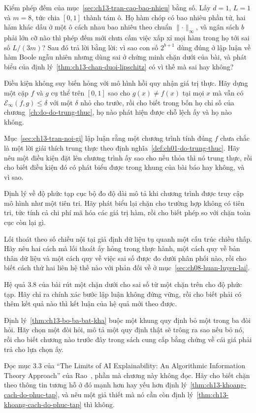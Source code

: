 \cauhoi
\begin{cauhoids}
  \item Kiểm phép đếm của mục~\ref{sec:ch13-tran-cao-bao-nhieu} bằng số. Lấy
  $d = 1$, $L = 1$ và $m = 8$, tức chia $[0,1]$ thành tám ô. Họ hàm chóp có bao
  nhiêu phần tử, hai hàm khác dấu ở một ô cách nhau bao nhiêu theo chuẩn
  $\lVert\cdot\rVert_{\infty}$, và ngân sách $b$ phải lớn cỡ nào thì phép đếm
  mới chưa cấm việc xấp xỉ mọi hàm trong họ tới sai số $L/(3m)$? Sau đó trả lời
  bằng lời: vì sao con số $2^{b+1}$ dùng đúng ở lập luận về hàm Boole ngẫu nhiên
  nhưng dùng sai ở chứng minh chặn dưới của bài, và phát biểu của định
  lý~\ref{thm:ch13-chan-duoi-lipschitz} có vì thế mà sai hay không?
  \item Điều kiện không suy biến hỏng với mô hình hồi quy nhận giá trị thực. Hãy
  dựng một cặp $f$ và $g$ cụ thể trên $[0,1]$ sao cho $g(x) \ne f(x)$ tại mọi
  $x$ mà vẫn có $\mathcal{E}_{\infty}(f,g) \le \delta$ với một $\delta$ nhỏ cho
  trước, rồi cho biết trong bốn họ chỉ số của
  chương~\ref{ch:do-do-trung-thuc}, họ nào phát hiện được chỗ lệch ấy và họ nào
  không.
  \item Mục~\ref{sec:ch13-tran-noi-gi} lập luận rằng một chương trình tính đúng
  $f$ chưa chắc là một lời giải thích trung thực theo định
  nghĩa~\ref{def:ch01-do-trung-thuc}. Hãy nêu một điều kiện đặt lên chương trình
  ấy sao cho nếu thỏa thì nó trung thực, rồi cho biết điều kiện đó có phát biểu
  được trong khung của bài báo hay không, và vì sao.
  \item Định lý về độ phức tạp cục bộ đo độ dài mô tả khi chương trình được truy
  cập mô hình như một tiên tri. Hãy phát biểu lại chặn cho trường hợp không có
  tiên tri, tức tính cả chi phí mã hóa các giá trị hàm, rồi cho biết phép so với
  chặn toàn cục còn lại gì.
  \item Lối thoát theo số chiều nội tại giả định dữ liệu tụ quanh một cấu trúc
  chiều thấp. Hãy nêu hai cách mà lối thoát ấy hỏng trong thực hành, một cách
  quy về bản thân dữ liệu và một cách quy về việc sai số được đo dưới phân phối
  nào, rồi cho biết cách thứ hai liên hệ thế nào với phản đối về
   ở
  mục~\ref{sec:ch08-huan-luyen-lai}.
  \item Hệ quả 3.8 của bài rút một chặn dưới cho sai số từ một chặn trên cho độ
  phức tạp. Hãy chỉ ra chính xác bước lập luận không đứng vững, rồi cho biết
  phải có thêm kết quả nào thì kết luận của hệ quả mới theo được.
  \item Định lý~\ref{thm:ch13-bo-ba-bat-kha} buộc một khung quy định bỏ một
  trong ba đòi hỏi. Hãy chọn một đòi hỏi, mô tả một quy định thật sẽ trông ra
  sao nếu bỏ nó, rồi cho biết chương nào trước đây trong sách cung cấp bằng
  chứng về cái giá phải trả cho lựa chọn ấy.
  \item Đọc mục 3.3 của \enquote{The Limits of AI Explainability: An Algorithmic
  Information Theory Approach} của Rao~\autocite{p26limits}, phần mà chương này
  không đọc. Hãy cho biết chặn theo thông tin tương hỗ ở đó mạnh hơn hay yếu hơn
  định lý~\ref{thm:ch13-khoang-cach-do-phuc-tap}, và nêu một giả thiết mà nó cần
  còn định lý~\ref{thm:ch13-khoang-cach-do-phuc-tap} thì không.
\end{cauhoids}
